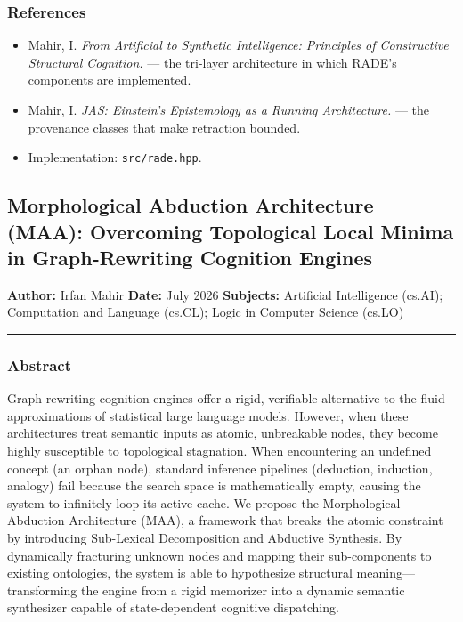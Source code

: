 \documentclass[
  11pt,
  a4paper,
]{article}
\providecommand{\tightlist}{%
  \setlength{\itemsep}{0pt}\setlength{\parskip}{0pt}}
\begin{document}
\subsubsection{References}\label{references}

\begin{itemize}
\tightlist
\item
  Mahir, I. \emph{From Artificial to Synthetic Intelligence: Principles
  of Constructive Structural Cognition.} --- the tri-layer architecture
  in which RADE's components are implemented.
\item
  Mahir, I. \emph{JAS: Einstein's Epistemology as a Running
  Architecture.} --- the provenance classes that make retraction
  bounded.
\item
  Implementation: \texttt{src/rade.hpp}.
\end{itemize}

\newpage

\subsection{Morphological Abduction Architecture (MAA): Overcoming
Topological Local Minima in Graph-Rewriting Cognition
Engines}\label{morphological-abduction-architecture-maa-overcoming-topological-local-minima-in-graph-rewriting-cognition-engines}

\textbf{Author:} Irfan Mahir \textbf{Date:} July 2026 \textbf{Subjects:}
Artificial Intelligence (cs.AI); Computation and Language (cs.CL); Logic
in Computer Science (cs.LO)

\begin{center}\rule{0.5\linewidth}{0.5pt}\end{center}

\subsubsection{Abstract}\label{abstract-1}

Graph-rewriting cognition engines offer a rigid, verifiable alternative
to the fluid approximations of statistical large language models.
However, when these architectures treat semantic inputs as atomic,
unbreakable nodes, they become highly susceptible to topological
stagnation. When encountering an undefined concept (an orphan node),
standard inference pipelines (deduction, induction, analogy) fail
because the search space is mathematically empty, causing the system to
infinitely loop its active cache. We propose the Morphological Abduction
Architecture (MAA), a framework that breaks the atomic constraint by
introducing Sub-Lexical Decomposition and Abductive Synthesis. By
dynamically fracturing unknown nodes and mapping their sub-components to
existing ontologies, the system is able to hypothesize structural
meaning---transforming the engine from a rigid memorizer into a dynamic
semantic synthesizer capable of state-dependent cognitive dispatching.
\end{document}
